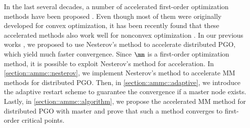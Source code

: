 {\highlight
	In the last several decades, a number of accelerated first-order optimization methods have been proposed \cite{nesterov1983method,nesterov2013introductory}. Even though most of them were originally developed for convex optimization, it has been recently found that these accelerated methods also work well for nonconvex optimization \cite{ghadimi2016accelerated,jin2018accelerated,li2015accelerated}. In our previous works \cite{fan2019proximal,fan2020mm}, we proposed to use Nesterov's method to accelerate  distributed PGO, which yield much faster convergence. Since  $\mm$  is a first-order optimization method, it is possible to exploit Nesterov's method for acceleration. In \cref{section::ammc::nesterov}, we implement Nesterov's method to accelerate MM methods for distributed PGO. Then, in \cref{section::ammc::adaptive}, we introduce the adaptive restart scheme \cite{o2015adaptive}  to guarantee the convergence if a master node exists. Lastly, in \cref{section::ammc::algorithm}, we propose the accelerated MM method for distributed PGO with master and  prove that such a method converges to first-order critical points.
}  

\vspace{-0.5em}
